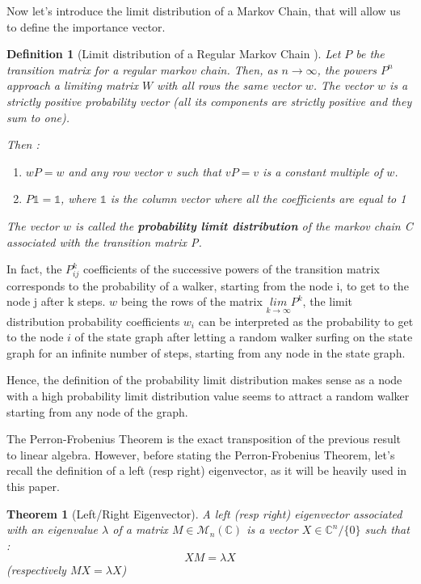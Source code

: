 \documentclass{article}
\newtheorem{definition}{Definition}[section]
\newtheorem{theo}{Theorem}[section]
\begin{document}
Now let's introduce the limit distribution of a Markov Chain, that will allow us to define the importance vector.

\begin{definition}[Limit distribution of a Regular Markov Chain \cite{grinstead_snell_2006}]
Let $P$ be the transition matrix for a regular markov chain. Then, as $n \rightarrow \infty$, the powers $P^n$ approach a limiting matrix $W$ with all rows the same vector $w$. The vector $w$ is a strictly positive probability vector (all its components are strictly positive and they sum to one).

Then :
\begin{enumerate}
    \item $wP = w$ and any row vector $v$ such that $vP = v$ is a constant multiple of $w$.
    \item $P \mathbb{1} = \mathbb{1}$, where $\mathbb{1}$ is the column vector where all the coefficients are equal to 1
\end{enumerate}

The vector $w$ is called the \textbf{probability limit distribution} of the markov chain C associated with the transition matrix P. 

\end{definition}

In fact, the $P^k_{ij}$ coefficients of the successive powers of the transition matrix corresponds to the probability of a walker, starting from the node i, to get to the node j after k steps. $w$ being the rows of the matrix $\underset{k\rightarrow \infty}{lim} P^k$, the limit distribution probability coefficients $w_i$ can be interpreted as the probability to get to the node $i$ of the state graph after letting a random walker surfing on the state graph for an infinite number of steps, starting from any node in the state graph.

Hence, the definition of the probability limit distribution makes sense as a node with a high probability limit distribution value seems to attract a random walker starting from any node of the graph. 

The Perron-Frobenius Theorem is the exact transposition of the previous result to linear algebra. However, before stating the Perron-Frobenius Theorem, let's recall the definition of a left (resp right) eigenvector, as it will be heavily used in this paper.

\begin{theo}[Left/Right Eigenvector]\label{theo:limit_distrib_markov_chain}
A left (resp right) eigenvector associated with an eigenvalue $\lambda$ of a matrix $M \in \mathcal{M}_n(\mathbb{C})$ is a vector $X \in \mathbb{C}^n / \{0\}$ such that : 
\begin{equation*}
    XM = \lambda X
\end{equation*}
(respectively $MX = \lambda X$)
\end{theo}
\end{document}
